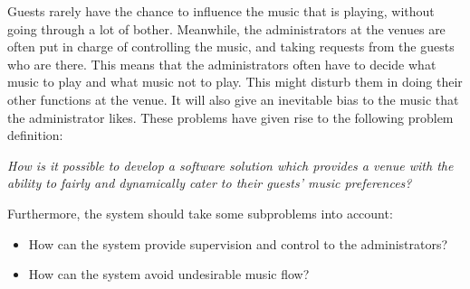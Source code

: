 \label{sub:problemStatement}
Guests rarely have the chance to influence the music that is playing, without going through a lot of bother. Meanwhile, the administrators at the venues are often put in charge of controlling the music, and taking requests from the guests who are there. This means that the administrators often have to decide what music to play and what music not to play. This might disturb them in doing their other functions at the venue. It will also give an inevitable bias to the music that the administrator likes. These problems have given rise to the following problem definition:

\begin{center}
\textit{How is it possible to develop a software solution which provides a venue with the ability to fairly and dynamically cater to their guests' music preferences?}
\end{center}

Furthermore, the system should take some subproblems into account:
\begin{itemize}
\item How can the system provide supervision and control to the administrators?
\item How can the system avoid undesirable music flow?
\end{itemize}